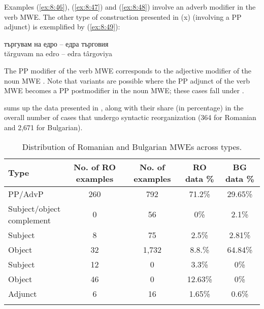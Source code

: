 \documentclass[output=paper]{langsci/langscibook}
\begin{document}
Examples (\ref{ex:8:46}), (\ref{ex:8:47}) and (\ref{ex:8:48}) involve an adverb modifier in the verb MWE.
The other type of construction presented in (x) (involving a PP
adjunct) is exemplified by (\ref{ex:8:49}):


\begin{exe}
\ex \label{ex:8:49}
\settowidth{}
\gll търгувам на едро -- едра търговия\\
tărguvam na edro -- edra târgoviya\\ 
\end{exe}

 
The PP modifier 
 of the verb MWE 
 corresponds to the adjective modifier  
 of the noun
MWE 
. Note that variants are possible where the PP
adjunct of the verb MWE becomes a PP post\textendash modifier in the noun MWE;
these cases fall under .



  sums up the data presented in , along with their share
(in percentage) in the overall number of cases that undergo syntactic
reorganization (364 for Romanian and 2,671 for Bulgarian).


\begin{table}
\begin{tabularx}{\textwidth}{lSSSS}
\lsptoprule
\textbf{Type} &
\textbf{No. of RO examples} &
\textbf{No. of examples}&
\textbf{RO data \%} &
\textbf{BG data \%}\\ 
\midrule
{} PP/AdvP &
260 &
792 &
71.2\% &
29.65\%\\
\parbox[t]{3cm}{ Subject/object\\[-.3em] complement} &
0 &
56 &
0\% &
2.1\%\\
{} Subject
&
8 &
75 &
2.5\% &
2.81\%\\
{} Object
&
32 &
1,732 &
8.8.\% &
64.84\%\\
{} Subject
&
12 &
0 &
3.3\% &
 0\%\\
{} Object
&
46 &
0 &
12.63\% &
0\%\\
{} Adjunct &
6 &
16 &
1.65\% &
0.6\%\\
\lspbottomrule
\end{tabularx}
\caption{Distribution of Romanian and Bulgarian MWEs across types.}
\label{tab:8:4}
\end{table}
\end{document}
